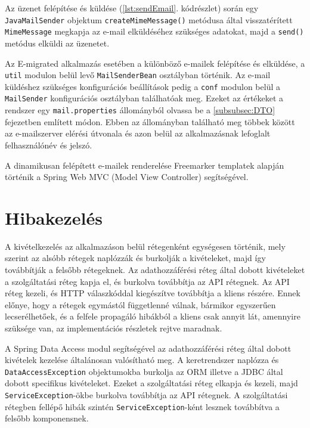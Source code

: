 Az üzenet felépítése és küldése (\ref{lst:sendEmail}. kódrészlet) során egy \texttt{JavaMailSender} objektum \texttt{createMimeMessage()} metódusa által visszatérített \texttt{MimeMessage} megkapja az e-mail elküldéséhez szükséges adatokat, majd a \texttt{send()} metódus elküldi az üzenetet. 

Az E-migrated alkalmazás esetében a különböző e-mailek felépítése és elküldése, a \texttt{util} modulon belül levő \texttt{MailSenderBean} osztályban történik. Az e-mail küldéshez szükséges konfigurációs beállítások pedig a \texttt{conf} modulon belül a \texttt{MailSender} konfigurációs osztályban találhatóak meg. Ezeket az értékeket a rendszer egy \texttt{mail.properties} állományból olvassa be a \ref{subsubsec:DTO} fejezetben említett módon. Ebben az állományban található meg többek között az e-mailszerver elérési útvonala és azon belül az alkalmazásnak lefoglalt felhasználónév és jelszó.

A dinamikusan felépített e-mailek renderelése Freemarker templatek alapján történik a Spring Web MVC (Model View Controller) segítségével.



\section{Hibakezelés}
\label{sec:hibakezeles}
A kivételkezelés az alkalmazáson belül rétegenként egységesen történik, mely szerint az alsóbb rétegek naplózzák és burkolják a kivételeket, majd így továbbítják a felsőbb rétegeknek. Az adathozzáférési réteg által dobott kivételeket a szolgáltatási réteg kapja el, és burkolva továbbítja az API rétegnek. Az API réteg kezeli, és HTTP válaszkóddal kiegészítve továbbítja a kliens részére. Ennek előnye, hogy a rétegek egymástól függetlenné válnak, bármikor egyszerűen lecserélhetőek, és a felfele propagáló hibákból a kliens csak annyit lát, amennyire szüksége van, az implementációs részletek rejtve maradnak. 

A Spring Data Access modul segítségével az adathozzáférési réteg által dobott kivételek kezelése általánosan valósítható meg. A keretrendszer naplózza és \texttt{DataAccessException} objektumokba burkolja az ORM illetve a JDBC által dobott specifikus kivételeket. Ezeket  a szolgáltatási réteg elkapja és kezeli, majd \texttt{ServiceException}-ökbe burkolva továbbítja az API rétegnek. A szolgáltatási rétegben fellépő hibák szintén \texttt{ServiceException}-ként lesznek továbbítva a felsőbb komponensnek. 

